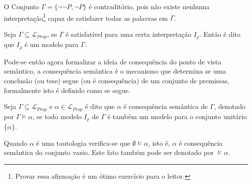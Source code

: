 \begin{exem}
    O Conjunto $\Gamma = \{\neg \neg P, \neg P\}$ é contraditório, pois não existe nenhuma interpretação\footnote{Provar essa afirmação é um ótimo exercício para o leitor.} capaz de satisfazer todas as palavras em $\Gamma$.
\end{exem}

\begin{definition}[Modelo]
    Seja $\Gamma \subseteq \mathcal{L}_{Prop}$, se $\Gamma$ é satisfatível para uma certa interpretação $I_\rho$. Então é dito que $I_\rho$ é um modelo para $\Gamma$.
\end{definition}

Pode-se então agora formalizar a ideia de consequência do ponto de vista semântico, a consequência semântica é o mecanismo que determina se uma conclusão (ou tese) segue (ou é consequência) de um conjunto de premissas, formalmente isto é definido como se segue.

\begin{definition}\label{def:ConsequenciaSemantica}
    Seja $\Gamma \subseteq \mathcal{L}_{Prop}$ e $\alpha \in \mathcal{L}_{Prop}$ é dito que $\alpha$ é consequência semântica de $\Gamma$, denotado por $\Gamma \vDash \alpha$, se todo modelo $I_\rho$ de $\Gamma$ é também um modelo para o conjunto unitário $\{\alpha\}$.
\end{definition}

\begin{rema}\label{rema:ConsequenciaSemantica}
    Quando $\alpha$ é uma tautologia verifica-se que $\emptyset \vDash \alpha$, isto é, $\alpha$ é consequência semântica do conjunto vazio. Este fato também pode ser denotado por $\vDash \alpha$.
\end{rema}

